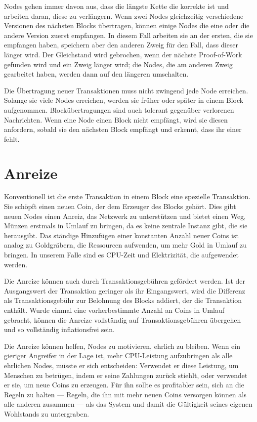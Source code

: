 \documentclass[9pt]{article}
\begin{document}
	Nodes gehen immer davon aus, dass die längste Kette die korrekte ist und arbeiten daran, diese zu verlängern. Wenn zwei Nodes gleichzeitig verschiedene Versionen des nächsten Blocks übertragen, können einige Nodes die eine oder die andere Version zuerst empfangen. In diesem Fall arbeiten sie an der ersten, die sie empfangen haben, speichern aber den anderen Zweig für den Fall, dass dieser länger wird. Der Gleichstand wird gebrochen, wenn der nächste Proof-of-Work gefunden wird und ein Zweig länger wird; die Nodes, die am anderen Zweig gearbeitet haben, werden dann auf den längeren umschalten.

	\newpage
	
	Die Übertragung neuer Transaktionen muss nicht zwingend jede Node erreichen. Solange sie viele Nodes erreichen, werden sie früher oder später in einem Block aufgenommen. Blockübertragungen sind auch tolerant gegenüber verlorenen Nachrichten. Wenn eine Node einen Block nicht empfängt, wird sie diesen anfordern, sobald sie den nächsten Block empfängt und erkennt, dass ihr einer fehlt.
		
	\section{Anreize}
	
	Konventionell ist die erste Transaktion in einem Block eine spezielle Transaktion. Sie schöpft einen neuen Coin, der dem Erzeuger des Blocks gehört. Dies gibt neuen Nodes einen Anreiz, das Netzwerk zu unterstützen und bietet einen Weg, Münzen erstmals in Umlauf zu bringen, da es keine zentrale Instanz gibt, die sie herausgibt. Das ständige Hinzufügen einer konstanten Anzahl neuer Coins ist analog zu Goldgräbern, die Ressourcen aufwenden, um mehr Gold in Umlauf zu bringen. In unserem Falle sind es CPU-Zeit und Elektrizität, die aufgewendet werden.

    Die Anreize können auch durch Transaktionsgebühren gefördert werden. Ist der Ausgangswert der Transaktion geringer als ihr Eingangswert, wird die Differenz als Transaktionsgebühr zur Belohnung des Blocks addiert, der die Transaktion enthält. Wurde einmal eine vorherbestimmte Anzahl an Coins in Umlauf gebracht, können die Anreize vollständig auf Transaktionsgebühren übergehen und so vollständig inflationsfrei sein.

    Die Anreize können helfen, Nodes zu motivieren, ehrlich zu bleiben. Wenn ein gieriger Angreifer in der Lage ist, mehr CPU-Leistung aufzubringen als alle ehrlichen Nodes, müsste er sich entscheiden: Verwendet er diese Leistung, um Menschen zu betrügen, indem er seine Zahlungen zurück stiehlt, oder verwendet er sie, um neue Coins zu erzeugen. Für ihn sollte es profitabler sein, sich an die Regeln zu halten — Regeln, die ihn mit mehr neuen Coins versorgen können als alle anderen zusammen — als das System und damit die Gültigkeit seines eigenen Wohlstands zu untergraben.
\end{document}
